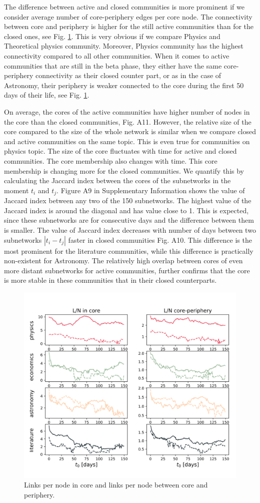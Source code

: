 The difference between active and closed communities is more prominent if we consider average number of core-periphery edges per core node. The connectivity between core and periphery is higher for the still active communities than for the closed ones, see Fig. \ref{fig:links_per_node}. This is very obvious if we compare Physics and Theoretical physics community. Moreover, Physics community has the highest connectivity compared to all other communities. When it comes to active communities that are still in the beta phase, they either have the same core-periphery connectivity as their closed counter part, or as in the case of Astronomy, their periphery is weaker connected to the core during the first 50 days of their life, see Fig. \ref{fig:links_per_node}. 

On average, the cores of the active communities have higher number of nodes in the core than the closed communities, Fig. A11. However, the relative size of the core compared to the size of the whole network is similar when we compare closed and active communities on the same topic. This is even true for communities on physics topic. The size of the core fluctuates with time for active and closed communities. The core membership also changes with time. This core membership is changing more for the closed communities. We quantify this by calculating the Jaccard index between the cores of the subnetworks in the moment $t_{i}$ and $t_{j}$. Figure A9 in Supplementary Information shows the value of Jaccard index between any two of the 150 subnetworks. The highest value of the Jaccard index is around the diagonal and has value close to 1. This is expected, since these subnetworks are for consecutive days and the difference between them is smaller. The value of Jaccard index decreases with number of days between two subnetworks $|t_{i}-t_{j}|$ faster in closed communities Fig. A10. This difference is the most prominent for the literature communities, while this difference is practically non-existent for Astronomy. The relatively high overlap between cores of even more distant subnetworks for active communities, further confirms that the core is more stable in these communities that in their closed counterparts. 


\begin{figure}
	\centering
	\includegraphics[width=0.5\linewidth]{Figures/LN_core_coreper.png}
	\caption{Links per node in core and links per node between core and periphery.}
	\label{fig:links_per_node}
\end{figure}


